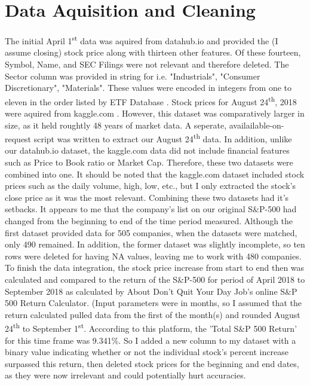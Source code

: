 \documentclass[12pt]{article}
\newcommand{\ts}{\textsuperscript}
\begin{document}
	\section*{Data Aquisition and Cleaning}\vspace{-2ex}
	The initial April 1\ts{\hspace{0.25ex}st} data was aquired from datahub.io \cite{datahub} and provided the (I assume closing) stock price along with thirteen other features. Of these fourteen, Symbol, Name, and SEC Filings were not relevant and therefore deleted. The Sector column was provided in string for i.e. "Industrials", "Consumer Discretionary", "Materials". These values were encoded in integers from one to eleven in the order listed by ETF Database \cite{etfDB}. Stock prices for August 24\ts{\hspace{0.25ex}th}, 2018 were aquired from kaggle.com \cite{kaggle}. However, this dataset was comparatively larger in size, as it held roughtly 48 years of market data. A seperate, availailable-on-request script was written to extract our August 24\ts{\hspace{0.25ex}th} data. In addition, unlike our datahub.io dataset, the kaggle.com data did not include financial features such as Price to Book ratio or Market Cap. Therefore, these two datasets were combined into one. It should be noted that the kaggle.com dataset included stock prices such as the daily volume, high, low, etc., but I only extracted the stock's close price as it was the most relevant. Combining these two datasets had it's setbacks. It appears to me that the company's list on our original S\&P-500 had changed from the beginning to end of the time period measured. Although the first dataset provided data for 505 companies, when the datasets were matched, only 490 remained. In addition, the former dataset was slightly incomplete, so ten rows were deleted for having NA values, leaving me to work with 480 companies. To finish the data integration, the stock price increase from start to end then was calculated and compared to the return of the S\&P-500 for period of April 2018 to September 2018 as calculated by About Don’t Quit Your Day Job's online S\&P 500 Return Calculator. (Input parameters were in months, so I assumed that the return calculated pulled data from the first of the month(s) and rounded August 24\ts{\hspace{0.25ex}th} to September 1\ts{\hspace{0.25ex}st}. Acccording to this platform, the 'Total S\&P 500 Return' for this time frame was 9.341\%. So I added a new column to my dataset with a binary value indicating whether or not the individual stock's percent increase surpassed this return, then deleted stock prices for the beginning and end dates, as they were now irrelevant and could potentially hurt accuracies.
	\vspace{-3.5ex}
\end{document}
